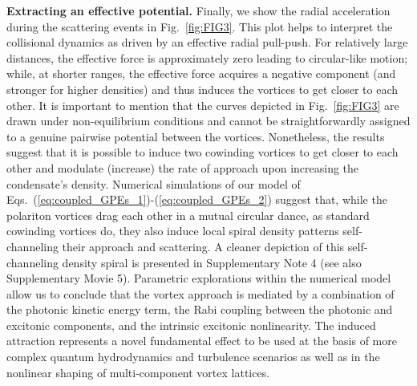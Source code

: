 \documentclass[aps,prb,twocolumn,superscriptaddress,nofootinbib]{revtex4}
\def\editr#1{#1}
\begin{document}
\noindent \editr{\textbf{Extracting an effective potential.}}
Finally, we show the radial acceleration during
the scattering events in Fig.~\ref{fig:FIG3}.
This plot helps to interpret the
collisional dynamics as driven by an effective radial pull-push.
For relatively large distances, the effective force is approximately
zero leading to circular-like motion;
while, at shorter ranges, the effective force
acquires a negative component (and stronger for higher densities)
and thus induces the vortices to get closer to each other.
%
It is important to mention that
the curves depicted in Fig.~\ref{fig:FIG3}
are drawn under non-equilibrium conditions and
cannot be straightforwardly assigned to a genuine pairwise potential between the vortices.
%
Nonetheless, the results suggest that it is possible to induce
two cowinding vortices
to get closer to each other and modulate (increase) the rate of approach
upon increasing the condensate's density.
%
Numerical simulations of our model of
Eqs.~(\ref{eq:coupled_GPEs_1})-(\ref{eq:coupled_GPEs_2}) suggest that,
while the polariton vortices drag each other in a mutual circular dance,
as standard cowinding vortices do,
they also induce local spiral density patterns
self-channeling their approach and scattering.
A cleaner depiction of this self-channeling density spiral
is presented in \editr{Supplementary Note 4}
(see also \editr{Supplementary Movie 5}).
%
Parametric explorations within the numerical model allow us to conclude
that the vortex approach is mediated by a combination
of the photonic kinetic energy term, the Rabi coupling between
the photonic and excitonic components,
and the intrinsic excitonic nonlinearity.
%
The induced \editr{attraction} represents a novel fundamental effect to be
used at the basis of more complex
quantum hydrodynamics and turbulence scenarios
as well as in the nonlinear shaping of multi-component vortex lattices.\\
\end{document}
